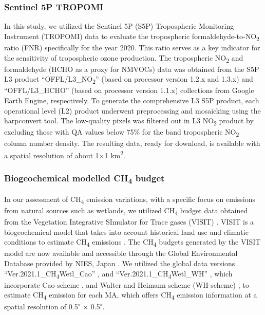 \subsubsection{Sentinel 5P TROPOMI}
In this study, we utilized the Sentinel 5P (S5P) Tropospheric Monitoring Instrument (TROPOMI) data to evaluate the tropospheric formaldehyde-to-NO\textsubscript{2} ratio (FNR) specifically for the year 2020. This ratio serves as a key indicator for the sensitivity of tropospheric ozone production. The tropospheric NO\textsubscript{2} and formaldehyde (HCHO \textminus as a proxy for NMVOCs) data was obtained from the S5P L3 product \enquote{OFFL\slash L3\_NO\textsubscript{2}} (based on processor version 1.2.x and 1.3.x) and \enquote{OFFL\slash L3\_HCHO} (based on processor version 1.1.x) collections from Google Earth Engine, respectively. To generate the comprehensive L3 S5P product, each operational level (L2) product underwent preprocessing and mosaicking using the harpconvert tool. The low-quality pixels was filtered out in L3 NO\textsubscript{2} product by excluding those with QA values below 75\% for the band tropospheric NO\textsubscript{2} column number density. The resulting data, ready for download, is available with a spatial resolution of about 1$\times$1 km\textsuperscript{2}.
\subsubsection{Biogeochemical modelled CH\textsubscript{4} budget}
In our assessment of CH\textsubscript{4} emission variations, with a specific focus on emissions from natural sources such as wetlands, we utilized CH\textsubscript{4} budget data obtained from the Vegetation Integrative SImulator for Trace gases (VISIT) \citep{ito2019methane}. VISIT is a biogeochemical model that takes into account historical land use and climatic conditions to estimate CH\textsubscript{4} emissions \citep{ito2019methane}. The CH\textsubscript{4} budgets generated by the VISIT model are now available and accessible through the Global Environmental Database provided by NIES, Japan \citep{ito2019methane}. We utilized the global data versions \enquote{Ver.2021.1\_CH\textsubscript{4}Wetl\_Cao} \citep{ito2021cao}, and \enquote{Ver.2021.1\_CH\textsubscript{4}Wetl\_WH} \citep{ito2021wh}, which incorporate Cao scheme \citep{cao1996global}, and Walter and Heimann scheme (WH scheme) \citep{walter2000process}, to estimate CH\textsubscript{4} emission for each MA, which offers CH\textsubscript{4} emission information at a spatial resolution of 0.5$^{\circ}$ $\times$ 0.5$^{\circ}$. \par
